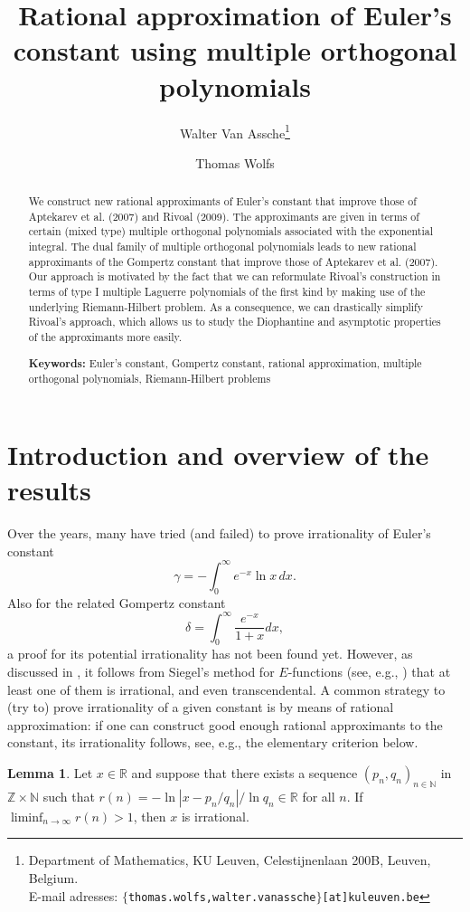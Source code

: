 \documentclass[a4paper,12pt,oneside]{article}
\title{Rational approximation of Euler's constant using multiple orthogonal polynomials}
\author{Walter Van Assche\footnote{Department of Mathematics, KU Leuven, Celestijnenlaan 200B, Leuven, Belgium. \\
E-mail adresses: \texttt{$\{$thomas.wolfs,walter.vanassche$\}$[at]kuleuven.be}}  \and Thomas Wolfs\footnotemark[1]}
\date{}
\theoremstyle{definition}
\newtheorem{lem}[defi]{Lemma}
\newcommand{\N}{\mathbb{N}}
\newcommand{\Z}{\mathbb{Z}}
\newcommand{\R}{\mathbb{R}}
\begin{document}
\maketitle

\begin{abstract}
We construct new rational approximants of Euler's constant that improve those of Aptekarev et al. (2007) and Rivoal (2009). The approximants are given in terms of certain (mixed type) multiple orthogonal polynomials associated with the exponential integral. The dual family of multiple orthogonal polynomials leads to new rational approximants of the Gompertz constant that improve those of Aptekarev et al. (2007). Our approach is motivated by the fact that we can reformulate Rivoal's construction in terms of type I multiple Laguerre polynomials of the first kind by making use of the underlying Riemann-Hilbert problem. As a consequence, we can drastically simplify Rivoal's approach, which allows us to study the Diophantine and asymptotic properties of the approximants more easily.
\medbreak


\textbf{Keywords:} Euler's constant, Gompertz constant, rational approximation, multiple orthogonal polynomials, Riemann-Hilbert problems
\end{abstract}


\section{Introduction and overview of the results}

Over the years, many have tried (and failed) to prove irrationality of Euler's constant 
$$\gamma = - \int_0^\infty e^{-x} \ln x \, dx. $$
Also for the related Gompertz constant 
$$\delta = \int_0^\infty \frac{e^{-x}}{1+x} dx,$$
a proof for its potential irrationality has not been found yet. However, as discussed in \cite{Apt,PilehroodLag,RivE}, it follows from Siegel’s method for $E$-functions (see, e.g., \cite{ShidlovskiiBook}) that at least one of them is irrational, and even transcendental. A common strategy to (try to) prove irrationality of a given constant is by means of rational approximation: if one can construct good enough rational approximants to the constant, its irrationality follows, see, e.g., the elementary criterion below.

\begin{lem} \label{OQ}
    Let $x\in\R$ and suppose that there exists a sequence $(p_n,q_n)_{n\in\N}$ in $\Z\times\N $ such that $r(n) = - \ln \left| x - p_n/q_n \right| / \ln q_n \in\R$ for all $n$. If $\liminf_{n\to\infty} r(n) > 1 $, then $x$ is irrational.
\end{lem}
\end{document}
